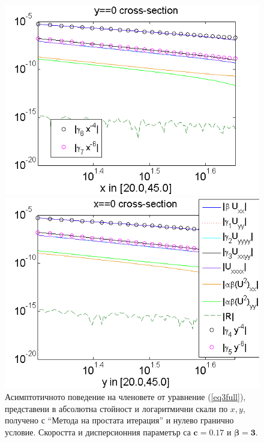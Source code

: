 \documentclass{article}
\newcommand{\rf}[1]{(\ref{#1})}
\begin{document}
\FloatBarrier
\begin{figure}[ht]
	\begin{minipage}[b]{0.95\linewidth}
		\raggedleft
		\includegraphics[width=\linewidth]{AssymptForEachTerm/c017_bt1_5/ChristovIC_AlongX_50_ZB2_bt3_c017_h020_O(h^6).png}
	\end{minipage}
	\begin{minipage}[b]{0.95\linewidth}
		 \raggedright
		\includegraphics[width=\linewidth]{AssymptForEachTerm/c017_bt1_5/ChristovIC_AlongY_50_ZB2_bt3_c017_h020_O(h^6).png}
	\end{minipage}
	\caption{Асимптотичното поведение на членовете от уравнение \rf{eq3full}, представени в абсолютна стойност и логаритмични скали по $x,y$, получено с ``Метода на простата итерация'' и нулево гранично условие. Скоростта и дисперсионния параметър са $\boldsymbol{c=0.17}$ и $\boldsymbol{\beta = 3}$.}
	\label{fig:assympt_c017bt3}
\end{figure}
\end{document}

